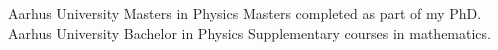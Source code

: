 \documentclass[%
               doublesided,
               paper=a4,
               fontsize=10pt
              ]{my-resume}
\begin{document}
{  
      {Aarhus University}
      {Masters in Physics}
      {
        Masters completed as part of my PhD.
      }
      {Aarhus University}
      {Bachelor in Physics}
      {
     Supplementary courses in mathematics.
          }


    
    
}
\makebody
\clearpage
\end{document}
